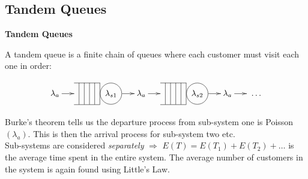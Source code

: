 \documentclass[compress]{beamer}        %
\makeatletter
\newcommand{\tcb}{\textcolor{beamer@blendedblue}}
\makeatother
\begin{document}
\subsection{Tandem Queues}
\begin{frame}{\bf \tcb{Tandem Queues}}

A tandem queue is a finite chain of queues where each customer must visit each one in order:

\begin{align*}
\xymatrixcolsep{0.5cm}
\xymatrix{\lambda_a \ar@{->}[r] & \hspace{-0.1cm}
{\begin{tabular}{@{}c|@{}c|@{}c|@{}c|@{}c|@{}c}
\cline{1-5}
&&&& &
\begin{tikzpicture}[baseline=(char.base)]
\node(char)[draw,shape=circle]{$\lambda_{s1}$};
\end{tikzpicture}\\
\cline{1-5}
\end{tabular}} \hspace{-0.3cm}\ar@{->}[r] & \lambda_a \ar@{->}[r] & \hspace{-0.1cm}
{\begin{tabular}{@{}c|@{}c|@{}c|@{}c|@{}c|@{}c}
\cline{1-5}
&&&& &
\begin{tikzpicture}[baseline=(char.base)]
\node(char)[draw,shape=circle]{$\lambda_{s2}$};
\end{tikzpicture}\\
\cline{1-5}
\end{tabular}} \hspace{-0.3cm}\ar@{->}[r] & \lambda_a \ar@{->}[r] & \hspace{0.1cm} \ldots
}
\end{align*}

Burke's theorem tells us the departure process from sub-system one is Poisson$(\lambda_a)$. This is then the arrival process for sub-system two etc.\\[0.6cm]

Sub-systems are considered \emph{separately} $\Rightarrow$ $E(T) = E(T_1) + E(T_2) + \ldots$ is the average time spent in the entire system. The average number of customers in the system is again found using Little's Law.


\end{frame}
\end{document}
